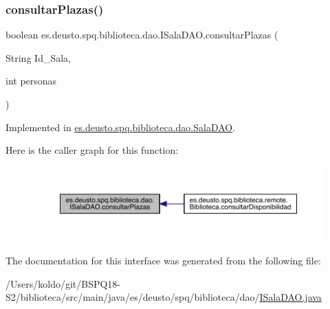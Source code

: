 \subsubsection{\texorpdfstring{consultar\+Plazas()}{consultarPlazas()}}
{\footnotesize\ttfamily boolean es.\+deusto.\+spq.\+biblioteca.\+dao.\+I\+Sala\+D\+A\+O.\+consultar\+Plazas (\begin{DoxyParamCaption}\item[{String}]{Id\+\_\+\+Sala,  }\item[{int}]{personas }\end{DoxyParamCaption})}



Implemented in \mbox{\hyperlink{classes_1_1deusto_1_1spq_1_1biblioteca_1_1dao_1_1_sala_d_a_o_a3095e0681af1d32bd5706ca6941e0784}{es.\+deusto.\+spq.\+biblioteca.\+dao.\+Sala\+D\+AO}}.

Here is the caller graph for this function\+:
\nopagebreak
\begin{figure}[H]
\begin{center}
\leavevmode
\includegraphics[width=350pt]{interfacees_1_1deusto_1_1spq_1_1biblioteca_1_1dao_1_1_i_sala_d_a_o_af12c5fe6a1abe11bc65e1118d991f926_icgraph}
\end{center}
\end{figure}


The documentation for this interface was generated from the following file\+:\begin{DoxyCompactItemize}
\item 
/\+Users/koldo/git/\+B\+S\+P\+Q18-\/\+S2/biblioteca/src/main/java/es/deusto/spq/biblioteca/dao/\mbox{\hyperlink{_i_sala_d_a_o_8java}{I\+Sala\+D\+A\+O.\+java}}\end{DoxyCompactItemize}
